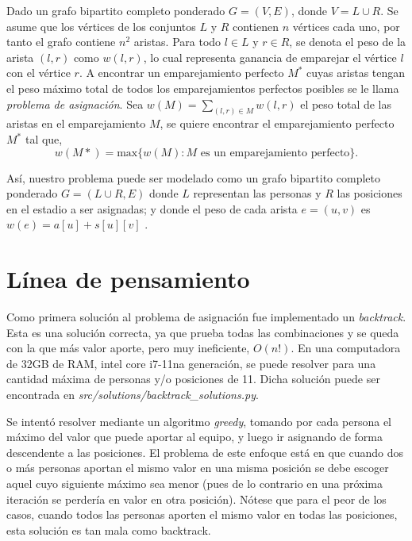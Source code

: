 \documentclass[10pt]{article} %
\begin{document}
	Dado un grafo bipartito completo ponderado $G = (V,E)$, donde $V = L \cup R$. Se asume que los v\'ertices de los conjuntos $L$ y $R$ contienen $n$ v\'ertices cada uno, por tanto el grafo contiene $n^2$ aristas. Para todo $l \in L$ y $r \in R$, se denota el peso de la arista $(l,r)$ como $w(l,r)$, lo cual representa ganancia de emparejar el v\'ertice $l$ con el v\'ertice $r$. A encontrar un emparejamiento perfecto $M^*$ cuyas aristas tengan el peso m\'aximo total de todos los emparejamientos perfectos posibles se le llama \textit{problema de asignaci\'on}. Sea $w(M) = \sum_{(l,r) \in M} w(l,r)$ el peso total de las aristas en el emparejamiento $M$, se quiere encontrar el emparejamiento perfecto $M^*$ tal que,
	\[w(M*)=\text{max}\{w(M):M \text{ es un emparejamiento perfecto}\} .\]
	
	As\'i, nuestro problema puede ser modelado como un grafo bipartito completo ponderado $ G = (L \cup R, E) $ donde $ L $ representan las personas y $ R $ las posiciones en el estadio a ser asignadas; y donde el peso de cada arista $ e = (u, v) $ es $ w(e) = a[u] + s[u][v] $ .
	
	\section{L\'inea de pensamiento}
	
	Como primera soluci\'on al problema de asignaci\'on fue implementado un \textit{backtrack}. Esta es una soluci\'on correcta, ya que prueba todas las combinaciones y se queda con la que m\'as valor aporte, pero muy ineficiente, $ O(n!) $. En una computadora de 32GB de RAM, intel core i7-11na generaci\'on, se puede resolver para una cantidad m\'axima de personas y/o posiciones de 11. Dicha soluci\'on puede ser encontrada en \textit{src/solutions/backtrack\_solutions.py}.
	
	Se intent\'o resolver mediante un algoritmo \textit{greedy}, tomando por cada persona el m\'aximo del valor que puede aportar al equipo, y luego ir asignando de forma descendente a las posiciones. El problema de este enfoque est\'a en que cuando dos o m\'as personas aportan el mismo valor en una misma posici\'on se debe escoger aquel cuyo siguiente m\'aximo sea menor (pues de lo contrario en una pr\'oxima iteraci\'on se perder\'ia en valor en otra posici\'on). N\'otese que para el peor de los casos, cuando todos las personas aporten el mismo valor en todas las posiciones, esta soluci\'on es tan mala como backtrack.
	
\end{document}
